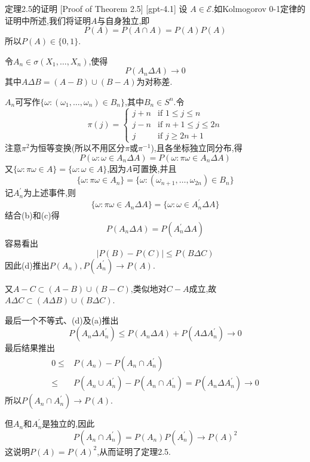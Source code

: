 \documentclass[UTF8]{ctexart}
\begin{document}
    \begin{prf}
        {定理2.5的证明}
        [Proof of Theorem 2.5]
        [gpt-4.1]
        设 $A \in \mathcal{E}$.如Kolmogorov 0-1定律的证明中所述,我们将证明$A$与自身独立,即
\[
P(A) = P(A \cap A) = P(A) P(A)
\]
所以$P(A) \in \{ 0, 1 \}$.

令$A_{n} \in \sigma(X_{1}, \ldots, X_{n})$,使得
\[
P(A_{n} \Delta A) \to 0
\]
其中$A \Delta B = (A - B) \cup (B - A)$为对称差.

$A_{n}$可写作$\{ \omega : (\omega_{1}, \ldots, \omega_{n}) \in B_{n} \}$,其中$B_{n} \in S^{n}$.令
\[
\pi(j) = \begin{cases}
j + n & \text{if } 1 \leq j \leq n \\
j - n & \text{if } n + 1 \leq j \leq 2n \\
j & \text{if } j \geq 2n + 1
\end{cases}
\]
注意$\pi^{2}$为恒等变换(所以不用区分$\pi$或$\pi^{-1}$),且各坐标独立同分布,得
\[
P(\omega : \omega \in A_{n} \Delta A) = P(\omega : \pi \omega \in A_{n} \Delta A)
\]
又$\{ \omega : \pi \omega \in A \} = \{ \omega : \omega \in A \}$,因为$A$可置换,并且
\[
\{ \omega : \pi \omega \in A_{n} \} = \{ \omega : (\omega_{n+1}, \ldots, \omega_{2n}) \in B_{n} \}
\]
记$A_{n}^{\prime}$为上述事件,则
\[
\{ \omega : \pi \omega \in A_{n} \Delta A \} = \{ \omega : \omega \in A_{n}^{\prime} \Delta A \}
\]
结合(b)和(c)得
\[
P(A_{n} \Delta A) = P(A_{n}^{\prime} \Delta A)
\]
容易看出
\[
| P(B) - P(C) | \leq P(B \Delta C)
\]
因此(d)推出$P(A_{n}), P(A_{n}^{\prime}) \to P(A)$.

又$A - C \subset (A - B) \cup (B - C)$,类似地对$C - A$成立,故$A \Delta C \subset (A \Delta B) \cup (B \Delta C)$.

最后一个不等式、(d)及(a)推出
\[
P(A_{n} \Delta A_{n}^{\prime}) \leq P(A_{n} \Delta A) + P(A \Delta A_{n}^{\prime}) \to 0
\]
最后结果推出
\[
\begin{array}{rl}
0 \leq & P(A_{n}) - P(A_{n} \cap A_{n}^{\prime}) \\
\leq & P(A_{n} \cup A_{n}^{\prime}) - P(A_{n} \cap A_{n}^{\prime}) = P(A_{n} \Delta A_{n}^{\prime}) \to 0
\end{array}
\]
所以$P(A_{n} \cap A_{n}^{\prime}) \to P(A)$.

但$A_{n}$和$A_{n}^{\prime}$是独立的,因此
\[
P(A_{n} \cap A_{n}^{\prime}) = P(A_{n}) P(A_{n}^{\prime}) \to P(A)^{2}
\]
这说明$P(A) = P(A)^{2}$,从而证明了定理2.5.

    \end{prf}
    
\end{document}
